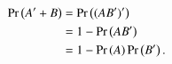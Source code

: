 \begin{align}
\Pr\left(A^\prime+B\right)&=\Pr\left((AB^\prime)^\prime\right)\\
	&=1-\Pr\left(AB^\prime\right)
\\
&=1-\Pr\left(A\right)\Pr\left(B^\prime\right).
\end{align}

